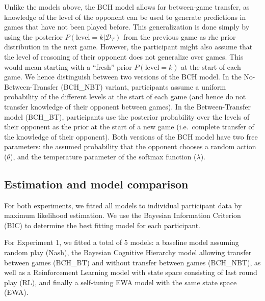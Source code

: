 \documentclass[man,floatsintext]{apa6}
\begin{document}
Unlike the models above, the BCH model allows for between-game transfer, as knowledge of the level of the opponent can be used to generate predictions in games that have not been played before. This generalization is done simply by using the posterior \(P(\text{level} = k|\mathcal{D}_T)\) from the previous game as rhe prior distribution in the next game. However, the participant might also assume that the level of reasoning of their opponent does not generalize over games. This would mean starting with a \enquote{fresh} prior \(P(\text{level} = k)\) at the start of each game. We hence distinguish between two versions of the BCH model. In the No-Between-Transfer (BCH\_NBT) variant, participants assume a uniform probability of the different levels at the start of each game (and hence do not transfer knowledge of their opponent between games). In the Between-Transfer model (BCH\_BT), participants use the posterior probability over the levels of their opponent as the prior at the start of a new game (i.e.~complete transfer of the knowledge of their opponent). Both versions of the BCH model have two free parameters: the assumed probability that the opponent chooses a random action (\(\theta\)), and the temperature parameter of the softmax function (\(\lambda\)).

\hypertarget{estimation-and-model-comparison}{%
\subsection{Estimation and model comparison}\label{estimation-and-model-comparison}}

For both experiments, we fitted all models to individual participant data by maximum likelihood estimation. We use the Bayesian Information Criterion (BIC) to determine the best fitting model for each participant.

For Experiment 1, we fitted a total of 5 models: a baseline model assuming random play (Nash), the Bayesian Cognitive Hierarchy model allowing transfer between games (BCH\_BT) and without transfer between games (BCH\_NBT), as well as a Reinforcement Learning model with state space consisting of last round play (RL), and finally a self-tuning EWA model with the same state space (EWA).
\end{document}
